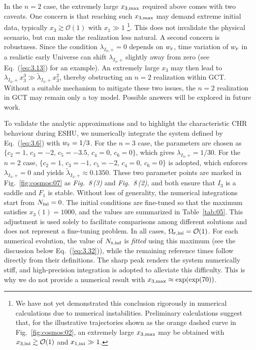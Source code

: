 \documentclass[aps,prd,twocolumn]{revtex4-2}
\newcommand\subF{\textsc{f}}
\newcommand\subini{{\rm ini}}
\newcommand\subSinf{{\rm \textsc{s}.inf}}
\newcommand\submax{{\rm max}}
\begin{document}
In the $n=2$ case, the extremely large $x_{3,\submax}$ required above comes with two caveats. One concern is that reaching such $x_{3,\submax}$ may demand extreme initial data, typically $x_3\gtrsim\mathcal{O}(1)$ with $x_1\gg1$ \footnote{We have not yet demonstrated this conclusion rigorously in numerical calculations due to numerical instabilities. Preliminary calculations \cite{NotShown} suggest that, for the illustrative trajectories shown as the orange dashed curve in Fig.~\ref{fig:cosmos:02}, an extremely large $x_{3,\submax}$ may be obtained with $x_{3,\subini}\gtrsim\mathcal{O}(1)$ and $x_{1,\subini}\gg1$.}. This does not invalidate the physical scenario, but can make the realization less natural. A second concern is robustness. Since the condition $\lambda_{I_3,+}=0$ depends on $w_\subF$, time variation of $w_\subF$ in a realistic early Universe can shift $\lambda_{I_3,+}$ slightly away from zero (see Eq.~(\ref{eq:3.13}) for an example). An extremely large $x_3$ may then lead to $\lambda_{I_3,+}\,x_3^3\gg \tilde{\lambda}_{I_3,+}\,x_3^2$, thereby obstructing an $n=2$ realization within GCT. Without a suitable mechanism to mitigate these two issues, the $n=2$ realization in GCT may remain only a toy model. Possible answers will be explored in future work.

To validate the analytic approximations and to highlight the characteristic CHR behaviour during ESHU, we numerically integrate the system defined by Eq.~(\ref{eq:3.6}) with $w_\subF=1/3$. For the $n=3$ case, the parameters are chosen as $\{c_2=1,\,c_3=-2,\,c_5=-3.5,\,c_4=0,\,c_6=0\}$, which gives $\lambda_{I_3,+}=1/30$. For the $n=2$ case, $\{c_2=1,\,c_3=-1,\,c_5=-2,\,c_4=0,\,c_6=0\}$ is adopted, which enforces $\lambda_{I_3,+}=0$ and yields $\tilde{\lambda}_{I_3,+}\approx0.1350$. These two parameter points are marked in Fig.~\ref{fig:cosmos:07} as \textit{Fig.~8\,(3)} and \textit{Fig.~8\,(2)}, and both ensure that $I_3$ is a saddle and $F_1$ is stable. Without loss of generality, the numerical integrations start from $N_\subini=0$. The initial conditions are fine-tuned so that the maximum satisfies $x_3(1)=1000$, and the values are summarized in Table~\ref{tab:05}. This adjustment is used solely to facilitate comparisons among different solutions and does not represent a fine-tuning problem. In all cases, $\Omega_{\subF,\subini}=\mathcal{O}(1)$. For each numerical evolution, the value of $N_\subSinf$ is \textit{fitted} using this maximum (see the discussion below Eq.~(\ref{eq:3.32})), while the remaining reference times follow directly from their definitions. The sharp peak renders the system numerically stiff, and high-precision integration is adopted to alleviate this difficulty. This is why we do not provide a numerical result with $x_{3,\submax}\approx\exp(\exp(70))$.
\end{document}

